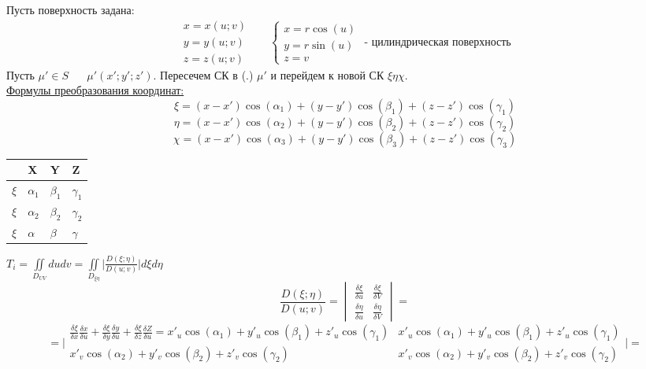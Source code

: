 \documentclass[12pt]{article}
\let\oldiint\iint
\renewcommand{\iint}{\oldiint\limits}
\begin{document}
  \vspace{1em}
  \par
  Пусть поверхность задана:
  \[
  \begin{matrix}
    x=x(u;v)\\
    y=y(u;v)\\
    z=z(u;v)
  \end{matrix} \hspace{20pt}
  \begin{cases}
    x=r\cos(u)\\
    y=r\sin(u)\\
    z=v
  \end{cases} \text{ - цилиндрическая поверхность}
  \]
  Пусть $\mu' \in S \hspace{20pt} \mu'(x';y';z')$. Пересечем СК в (.) $\mu'$ и перейдем к новой
  СК $\xi \eta \chi$.\\
  \break
  \underline{Формулы преобразования координат:}
  \[\xi=(x-x')\cos(\alpha_1)+(y-y')\cos(\beta_1)+(z-z')\cos(\gamma_1)\]
  \[\eta=(x-x')\cos(\alpha_2)+(y-y')\cos(\beta_2)+(z-z')\cos(\gamma_2)\]
  \[\chi=(x-x')\cos(\alpha_3)+(y-y')\cos(\beta_3)+(z-z')\cos(\gamma_3)\]
  \begin{tabular}{ p{10pt}|p{10pt}|p{10pt}|p{10pt} }
    & X & Y & Z\\
    \hline
    $\xi$ & $\alpha_1$ & $\beta_1$ & $\gamma_1$\\
    \hline
    $\xi$ & $\alpha_2$ & $\beta_2$ & $\gamma_2$\\
    \hline
    $\xi$ & $\alpha$ & $\beta$ & $\gamma$\\
  \end{tabular}
  \hspace{20pt} $T_i = \iint_{D_{UV}}dudv=\iint_{D_{\xi \eta}}\Big| \frac{D(\xi;\eta)}{D(u;v)}\Big|
  d \xi d \eta$
  \[\frac{D(\xi;\eta)}{D(u;v)}=
  \begin{vmatrix}
    \frac{\delta \xi}{\delta u} &\frac{\delta \xi}{\delta V}\\
    \frac{\delta\eta}{\delta u} &\frac{\delta \eta}{\delta V}
  \end{vmatrix}=
  \]
  \[=\Big|
  \begin{matrix}
  \frac{\delta \xi}{\delta x}\frac{\delta x}{\delta u}+\frac{\delta \xi}{\delta y}\frac{\delta y}{\delta u}+
  \frac{\delta \xi}{\delta z}\frac{\delta Z}{\delta u} = x'_u\cos(\alpha_1)+y'_u\cos(\beta_1)+z'_u\cos(\gamma_1) & x'_u\cos(\alpha_1)+y'_u\cos(\beta_1)+z'_u\cos(\gamma_1) \\
  x'_v\cos(\alpha_2)+y'_v\cos(\beta_2)+z'_v\cos(\gamma_2) & x'_v\cos(\alpha_2)+y'_v\cos(\beta_2)+z'_v\cos(\gamma_2) 
  \end{matrix}\Big| =
  \]
\end{document}
